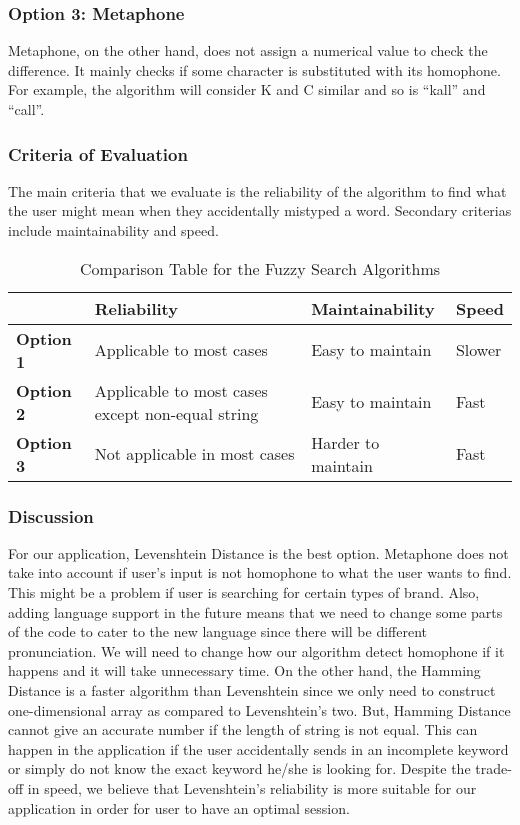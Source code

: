 \documentclass[journal,compsoc, 10pt, draftclsnofoot, onecolumn]{IEEEtran}
\begin{document}
\subsubsection{Option 3: Metaphone}
Metaphone, on the other hand, does not assign a numerical value to check the difference. It mainly checks if some character is substituted with its homophone. For example, the algorithm will consider K and C similar and so is “kall” and “call”. 

\subsubsection{Criteria of Evaluation}
The main criteria that we evaluate is the reliability of the algorithm to find what the user might mean when they accidentally mistyped a word. Secondary criterias include maintainability and speed.

\begin{table}[h]
	\centering
	\caption{Comparison Table for the Fuzzy Search Algorithms}
	\label{Comparison Table for the Fuzzy Search Algorithms}
	\begin{tabularx}{\textwidth}{|l|l|l|X|}
		\hline
		\textbf{}         & \textbf{Reliability}                & \textbf{Maintainability}                & \textbf{Speed} 
		\\ \hline
		\textbf{Option 1} & Applicable to most cases & Easy to maintain & Slower
		\\ \hline
		\textbf{Option 2} & Applicable to most cases except non-equal string & Easy to maintain & Fast                                                                                       
		\\ \hline
		\textbf{Option 3} & Not applicable in most cases & Harder to maintain & Fast                                                               
		\\ \hline
	\end{tabularx}
\end{table}

\subsubsection{Discussion}
For our application, Levenshtein Distance is the best option. Metaphone does not take into account if user’s input is not homophone to what the user wants to find. This might be a problem if user is searching for certain types of brand. Also, adding language support in the future means that we need to change some parts of the code to cater to the new language since there will be different pronunciation. We will need to change how our algorithm detect homophone if it happens and it will take unnecessary time. On the other hand, the Hamming Distance is a faster algorithm than Levenshtein since we only need to construct one-dimensional array as compared to Levenshtein’s two. But, Hamming Distance cannot give an accurate number if the length of string is not equal. This can happen in the application if the user accidentally sends in an incomplete keyword or simply do not know the exact keyword he/she is looking for. Despite the trade-off in speed, we believe that Levenshtein’s reliability is more suitable for our application in order for user to have an optimal session.
\end{document}
